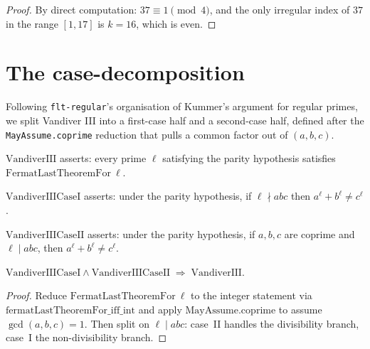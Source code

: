 \begin{proof}\leanok
  By direct computation: $37 \equiv 1 \pmod 4$, and the only irregular
  index of $37$ in the range $[1, 17]$ is $k = 16$, which is even.
\end{proof}

\section{The case-decomposition}

Following \texttt{flt-regular}'s organisation of Kummer's argument for
regular primes, we split Vandiver III into a first-case half and a
second-case half, defined after the \texttt{MayAssume.coprime} reduction
that pulls a common factor out of $(a,b,c)$.

\begin{definition}
  \label{def:vandiverIII}
  \leanok
  $\mathrm{VandiverIII}$ asserts: every prime $\ell$ satisfying the parity
  hypothesis satisfies $\mathrm{FermatLastTheoremFor}\ \ell$.
\end{definition}

\begin{definition}
  \label{def:vandiverIIICaseI}
  \leanok
  $\mathrm{VandiverIIICaseI}$ asserts: under the parity hypothesis, if
  $\ell \nmid abc$ then $a^\ell + b^\ell \neq c^\ell$.
\end{definition}

\begin{definition}
  \label{def:vandiverIIICaseII}
  \leanok
  $\mathrm{VandiverIIICaseII}$ asserts: under the parity hypothesis, if
  $a,b,c$ are coprime and $\ell \mid abc$, then $a^\ell + b^\ell \neq c^\ell$.
\end{definition}

\begin{theorem}
  \label{thm:vandiverIII_of_caseI_caseII}
  \leanok
  $\mathrm{VandiverIIICaseI} \land \mathrm{VandiverIIICaseII}
    \;\Longrightarrow\; \mathrm{VandiverIII}$.
\end{theorem}

\begin{proof}\leanok
  Reduce $\mathrm{FermatLastTheoremFor}\ \ell$ to the integer statement via
  $\mathrm{fermatLastTheoremFor\_iff\_int}$ and apply
  $\mathrm{MayAssume.coprime}$ to assume $\gcd(a,b,c) = 1$.  Then split on
  $\ell \mid abc$: case~II handles the divisibility branch, case~I the
  non-divisibility branch.
\end{proof}

